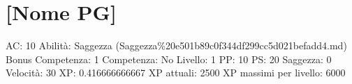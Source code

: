 \section{{[}Nome PG{]}}\label{nome-pg}

AC: 10 Abilità: Saggezza
(Saggezza\%20e501b89c0f344df299cc5d021befadd4.md) Bonus Competenza: 1
Competenza: No Livello: 1 PP: 10 PS: 20 Saggezza: 0 Velocità: 30 XP:
0.416666666667 XP attuali: 2500 XP massimi per livello: 6000
